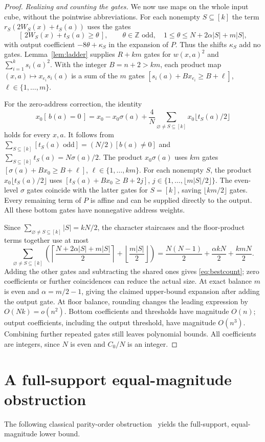 \documentclass[11pt]{article}
\newcommand{\ind}[1]{[\,#1\,]}
\begin{document}
\begin{proof}
\emph{Realizing and counting the gates.}
We now use maps on the whole input cube, without the pointwise abbreviations.
For each nonempty $S\subseteq[k]$ the term
$r_S(2W_S(x)+t_S(a))$ uses the gates
$$\ind{2W_S(x)+t_S(a)\ge\theta},\qquad
\theta\in\mathbb Z\text{ odd},\quad
1\le\theta\le N+2\alpha|S|+m|S|,$$
with output coefficient $-8\theta+\kappa_S$ in the expansion of $P$.
Thus the shifts $\kappa_S$ add no gates.
Lemma~\ref{lem:ladder} supplies $R+km$ gates for
$w(x,a)^2$ and $\sum_{i=1}^k s_i(a)^2$.
With the integer $B=n+2>km$, each product map
$(x,a)\mapsto x_{e_i}s_i(a)$ is a sum of the $m$ gates
$[s_i(a)+Bx_{e_i}\ge B+\ell]$, $\ell\in\{1,\ldots,m\}$.

For the zero-address correction, the identity
$$x_0\ind{b(a)=0}=x_0-x_0\sigma(a)+
 \frac4N\sum_{\varnothing\ne S\subseteq[k]}x_0\lfloor t_S(a)/2\rfloor$$
holds for every $x,a$. It follows from
$\sum_{S\subseteq[k]}[t_S(a)\text{ odd}]=(N/2)[b(a)\ne0]$
and $\sum_{S\subseteq[k]}t_S(a)=N\sigma(a)/2$.
The product $x_0\sigma(a)$ uses $km$ gates
$[\sigma(a)+Bx_0\ge B+\ell]$, $\ell\in\{1,\ldots,km\}$.
For each nonempty $S$, the product $x_0\lfloor t_S(a)/2\rfloor$ uses
$[t_S(a)+Bx_0\ge B+2j]$,
$j\in\{1,\ldots,\lfloor m|S|/2\rfloor\}$.
The even-level $\sigma$ gates coincide with the latter gates for $S=[k]$,
saving $\lfloor km/2\rfloor$ gates.
Every remaining term of $P$ is affine and can be supplied directly to
the output. All these bottom gates have nonnegative address weights.

Since $\sum_{\varnothing\ne S\subseteq[k]}|S|=kN/2$, the character
staircases and the floor-product terms together use at most
$$\sum_{\varnothing\ne S\subseteq[k]}\left(
 \left\lceil\frac{N+2\alpha|S|+m|S|}{2}\right\rceil
 +\left\lfloor\frac{m|S|}{2}\right\rfloor\right)
 =\frac{N(N-1)}2+\frac{\alpha kN}2+\frac{kmN}2.$$
Adding the other gates and subtracting the shared ones gives
\eqref{eq:bestcount}; zero coefficients or further coincidences can
reduce the actual size.
At exact balance $m$ is even and $\alpha=m/2-1$, giving the claimed
upper-bound expansion after adding the output gate.
At floor balance, rounding changes the leading expression by
$O(Nk)=o(n^2)$.
Bottom coefficients and thresholds have magnitude $O(n)$; output
coefficients, including the output threshold, have magnitude $O(n^3)$.
Combining further repeated gates still leaves polynomial bounds.
All coefficients are integers, since $N$ is even and $C_0/N$ is an integer.
\end{proof}

\section{A full-support equal-magnitude obstruction}\label{sec:fullsign}
The following classical parity-order obstruction~\cite[Section~3.1]{MP}
yields the full-support, equal-magnitude lower bound.
\end{document}
